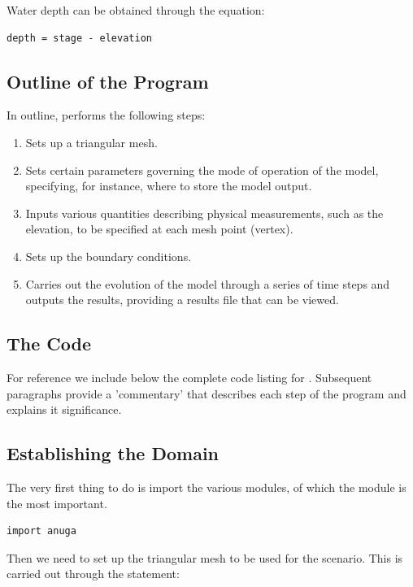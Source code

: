 \documentclass{manual}
\begin{document}
Water depth can be obtained through the equation:

\begin{verbatim}
depth = stage - elevation
\end{verbatim}

\subsection{Outline of the Program}

In outline,  performs the following steps:
\begin{enumerate}
   \item Sets up a triangular mesh.
   \item Sets certain parameters governing the mode of
         operation of the model, specifying, for instance,
         where to store the model output.
   \item Inputs various quantities describing physical measurements, such
         as the elevation, to be specified at each mesh point (vertex).
   \item Sets up the boundary conditions.
   \item Carries out the evolution of the model through a series of time
         steps and outputs the results, providing a results file that can
         be viewed.
\end{enumerate}

\subsection{The Code}

For reference we include below the complete code listing for
. Subsequent paragraphs provide a
'commentary' that describes each step of the program and explains it
significance.

\label{ref:runup_py_code}



\subsection{Establishing the Domain}

The very first thing to do is import the various modules, of which the 
\anuga{} module is the most important. 
%
\begin{verbatim}
import anuga
\end{verbatim}
%
Then we need to set up the triangular mesh to be used for the
scenario. This is carried out through the statement:
\end{document}
